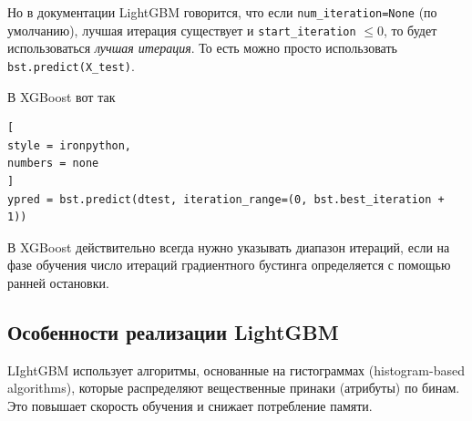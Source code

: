 \documentclass[%
	11pt,
	a4paper,
	utf8,
		]{article}
\begin{document}
Но в документации LightGBM говорится, что если \verb|num_iteration=None| (по умолчанию), лучшая итерация существует и \verb|start_iteration| $ \leqslant 0 $, то будет использоваться \emph{лучшая итерация}. То есть можно просто использовать \verb|bst.predict(X_test)|.

В XGBoost вот так
\begin{lstlisting}[
style = ironpython,
numbers = none
]
ypred = bst.predict(dtest, iteration_range=(0, bst.best_iteration + 1))
\end{lstlisting}

В XGBoost действительно всегда нужно указывать диапазон итераций, если на фазе обучения число итераций градиентного бустинга определяется с помощью ранней остановки.

\subsection{Особенности реализации LightGBM}

LIghtGBM использует алгоритмы, основанные на гистограммах (histogram-based algorithms), которые распределяют вещественные принаки (атрибуты) по бинам. Это повышает скорость обучения и снижает потребление памяти.
\end{document}
